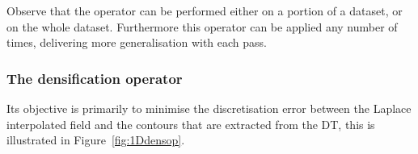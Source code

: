 
Observe that the operator can be performed either on a portion of a dataset, or on the whole dataset. 
Furthermore this operator can be applied any number of times, delivering more generalisation with each pass.


%
\subsubsection{The densification operator}
\label{sec:densification}

Its objective is primarily to minimise the discretisation error between the Laplace interpolated field and the contours that are extracted from the DT, this is illustrated in Figure~\ref{fig:1Ddensop}.
